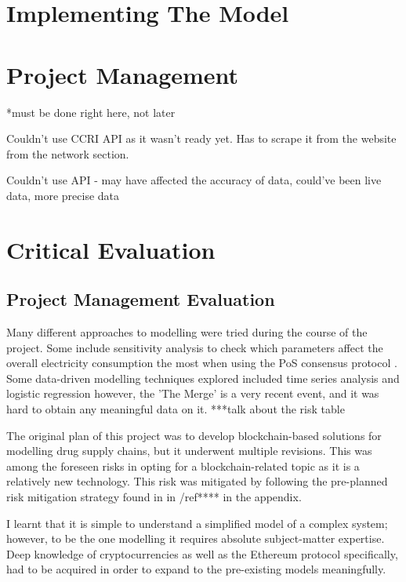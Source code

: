 \section {Implementing The Model}


\section {Project Management}
*must be done right here, not later

Couldn't use CCRI API as it wasn't ready yet. Has to scrape it from the website from the network section.

Couldn't use API - may have affected the accuracy of data, could've been live data, more precise data

\section{Critical Evaluation}

\subsection{Project Management Evaluation}

Many different approaches to modelling were tried during the course of the project. Some include sensitivity analysis to check which parameters affect the overall electricity consumption the most when using the PoS consensus protocol \cite{MarionAnModelling}. Some data-driven modelling techniques explored included time series analysis and logistic regression \cite{IbanezTheExpansion} however, the 'The Merge' is a very recent event, and it was hard to obtain any meaningful data on it.  ***talk about the risk table

The original plan of this project was to develop blockchain-based solutions for modelling drug supply chains, but it underwent multiple revisions. This was among the foreseen risks in opting for a blockchain-related topic as it is a relatively new technology. This risk was mitigated by following the pre-planned risk mitigation strategy found in in /ref**** in the appendix.

I learnt that it is simple to understand a simplified model of a complex system; however, to be the one modelling it requires absolute subject-matter expertise. Deep knowledge of cryptocurrencies as well as the Ethereum protocol specifically, had to be acquired in order to expand to the pre-existing models meaningfully. 